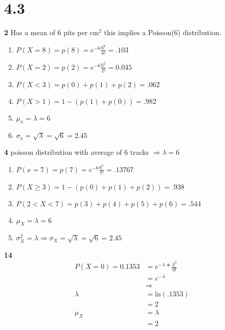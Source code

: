 \documentclass[12pt]{report}
\begin{document}
\section*{4.3}
 {\bf 2}
   Has a mean of 6 pits per cm$^2$ this implies a Poisson(6) distribution.
   \begin{enumerate}[label={\bf \alph*}]
      \item $P(X=8) = p(8)= e^{-6}\frac{6^8}{8!}=.103$
      \item $P(X = 2) = p(2) =  e^{-6}\frac{6^2}{2!}=0.045$
      \item $P(X<3)= p(0)+p(1)+p(2)=.062$
      \item $P(X>1)= 1-(p(1)+p(0))=.982$
      \item $\mu_x=\lambda=6$
      \item $\sigma_x=\sqrt{\lambda}=\sqrt{6}=2.45$
   \end{enumerate}
 
 
 {\bf 4}
 poisson distribution with average of 6 tracks $\Rightarrow \lambda = 6$ 
    \begin{enumerate}[label={\bf \alph*}]
    \item $P(x=7)=p(7)=e^{-6}\frac{6^7}{7!}=.13767$
    \item $P(X\geq 3)= 1-(p(0)+p(1)+p(2))= .938$
    \item $P(2<X<7)=p(3)+p(4)+p(5)+p(6)=.544$
    \item $\mu_X = \lambda = 6$
    \item $\sigma^2_X=\lambda \Rightarrow \sigma_X = \sqrt{\lambda}= \sqrt{6}=2.45$
   \end{enumerate}
 
 
 
 {\bf 14}
  \begin{align*}
  P(X=0)= 0.1353 &=e^{-\lambda}*\frac{\lambda^0}{0!}\\
        &=e^{-\lambda}\\ 
        &\Rightarrow\\ 
 \lambda&=\text{ln}(.1353)\\
        &= 2\\
  \mu_X &= \lambda\\
        &= 2
  \end{align*}
\end{document}
